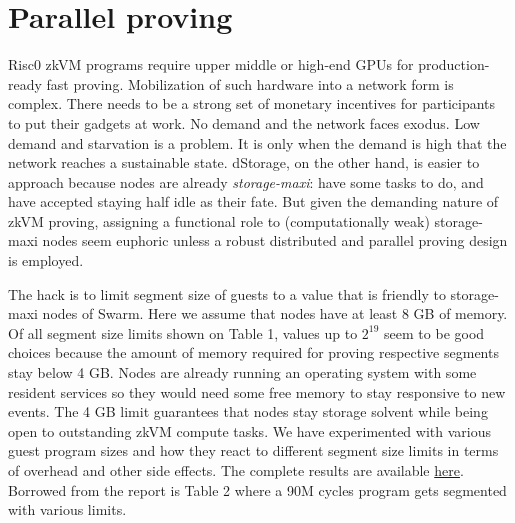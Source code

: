 \documentclass[a4paper, 10pt]{article}
\begin{document}
\section{Parallel proving}
Risc0 zkVM programs require upper middle or high-end GPUs for production-ready fast proving. Mobilization of such hardware into a network form is complex. There needs to be a strong set of monetary incentives for participants to put their gadgets at work. No demand and the network faces exodus. Low demand and starvation is a problem. It is only when the demand is high that the network reaches a sustainable state. dStorage, on the other hand, is easier to approach because nodes are already \textit{storage-maxi}: have some tasks to do, and have accepted staying half idle as their fate. But given the demanding nature of zkVM proving, assigning a functional role to (computationally weak) storage-maxi nodes seem euphoric unless a robust distributed and parallel proving design is employed.
\par
The hack is to limit segment size of guests to a value that is friendly to storage-maxi nodes of Swarm. Here we assume that nodes have at least 8 GB of memory. Of all segment size limits shown on Table 1, values up to $2^{19}$ seem to be good choices because the amount of memory required for proving respective segments stay below 4 GB. Nodes are already running an operating system with some resident services so they would need some free memory to stay responsive to new events. The 4 GB limit guarantees that nodes stay storage solvent while being open to outstanding zkVM compute tasks. We have experimented with various guest program sizes and how they react to different segment size limits in terms of overhead and other side effects. The complete results are available \href{https://github.com/WholesumNet/docs/blob/main/parallelization/segmentation/report/report.pdf}{here}. Borrowed from the report is Table 2 where a 90M cycles program gets segmented with various limits.
\end{document}
